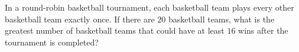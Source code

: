 In a round-robin basketball tournament, each basketball team plays every other basketball team exactly once. If there are $20$ basketball teams, what is the greatest number of basketball teams that could have at least $16$ wins after the tournament is completed?
